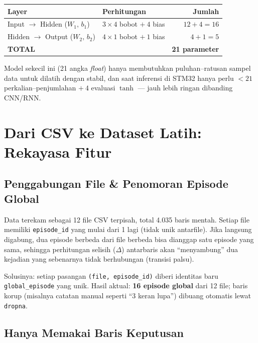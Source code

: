 \documentclass[11pt,a4paper]{article}
\begin{document}
\begin{center}
\begin{tabular}{@{}l l r@{}}
\toprule
\textbf{Layer} & \textbf{Perhitungan} & \textbf{Jumlah} \\
\midrule
Input $\to$ Hidden ($W_1,\,b_1$) & $3 \times 4$ bobot $+\ 4$ bias & $12+4=16$ \\
Hidden $\to$ Output ($W_2,\,b_2$) & $4 \times 1$ bobot $+\ 1$ bias & $4+1=5$ \\
\midrule
\textbf{TOTAL} & & \textbf{21 parameter} \\
\bottomrule
\end{tabular}
\end{center}

Model sekecil ini (21 angka \emph{float}) hanya membutuhkan puluhan--ratusan sampel data
untuk dilatih dengan stabil, dan saat inferensi di STM32 hanya perlu $<21$
perkalian--penjumlahan $+\ 4$ evaluasi $\tanh$ --- jauh lebih ringan dibanding CNN/RNN.

\section{Dari CSV ke Dataset Latih: Rekayasa Fitur}
\label{sec:featureeng}

\subsection{Penggabungan File \& Penomoran Episode Global}

Data terekam sebagai 12 file CSV terpisah, total 4.035 baris mentah. Setiap file memiliki
\texttt{episode\_id} yang mulai dari 1 lagi (tidak unik antarfile). Jika langsung
digabung, dua episode berbeda dari file berbeda bisa dianggap satu episode yang sama,
sehingga perhitungan selisih ($\Delta$) antarbaris akan ``menyambung'' dua kejadian yang
sebenarnya tidak berhubungan (transisi palsu).

Solusinya: setiap pasangan \texttt{(file, episode\_id)} diberi identitas baru
\texttt{global\_episode} yang unik. Hasil aktual: \textbf{16 episode global} dari 12 file;
baris korup (misalnya catatan manual seperti ``3 keran lupa'') dibuang otomatis lewat
\texttt{dropna}.

\subsection{Hanya Memakai Baris Keputusan}
\end{document}
